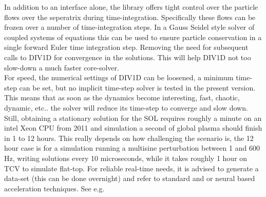 \documentclass[amsmath,amssymb,a4]{revtex4-2}
\begin{document}
\noindent In addition to an interface alone, the library offers tight control over the particle flows over the seperatrix during time-integration. Specifically these flows can be frozen over a number of time-integration steps. In a Gauss Seidel style solver of coupled systems of equations this can be used to ensure particle conservation in a single forward Euler time integration step. Removing the need for subsequent calls to DIV1D for convergence in the solutions. This will help DIV1D not too slow-down a much faster core-solver.\\

\noindent For speed, the numerical settings of DIV1D can be loosened, a minimum time-step can be set, but no implicit time-step solver is tested in the present version. This means that as soon as the dynamics become interesting, fast, chaotic, dynamic, etc.. the solver will reduce its time-step to converge and slow down. Still, obtaining a stationary solution for the SOL requires roughly a minute on an intel Xeon CPU from 2011 and simulation a second of global plasma should finish in 1 to 12 hours. This really depends on how challenging the scenario is, the 12 hour case is for a simulation running a multisine perturbation between 1 and 600 Hz, writing solutions every 10 microseconds, while it takes roughly 1 hour on TCV to simulate flat-top. For reliable real-time needs, it is advised to generate a data-set (this can be done overnight) and refer to standard and or neural based acceleration techniques. See e.g. \cite{poels2023}\\



\cleardoublepage
\end{document}
